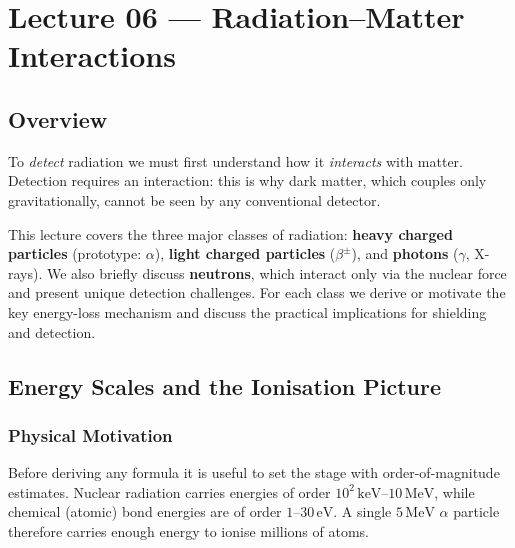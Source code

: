 
\section{Lecture 06 — Radiation–Matter Interactions}
\label{sec:lec06}
\date{19 May 2026}

\subsection*{Overview}
To \emph{detect} radiation we must first understand how it \emph{interacts} with matter.
Detection requires an interaction: this is why dark matter, which couples
only gravitationally, cannot be seen by any conventional detector.

This lecture covers the three major classes of radiation:
\textbf{heavy charged particles} (prototype: $\alpha$), \textbf{light charged particles}
($\beta^\pm$), and \textbf{photons} ($\gamma$, X-rays).  We also briefly discuss
\textbf{neutrons}, which interact only via the nuclear force and present unique
detection challenges.  For each class we derive or motivate the key energy-loss
mechanism and discuss the practical implications for shielding and detection.

\subsection{Energy Scales and the Ionisation Picture}
\label{subsec:lec06:energy_scales}

\subsubsection*{Physical Motivation}
Before deriving any formula it is useful to set the stage with order-of-magnitude
estimates.  Nuclear radiation carries energies of order
$10^2\,\text{keV}$–$10\,\text{MeV}$, while chemical (atomic) bond energies are
of order $1$–$30\,\text{eV}$.  A single $5\,\text{MeV}$ $\alpha$ particle therefore
carries enough energy to ionise millions of atoms.

